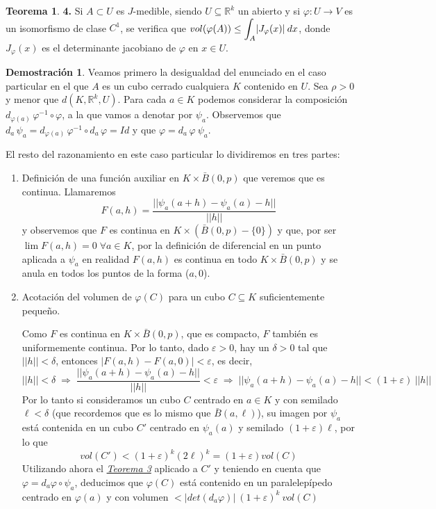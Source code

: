 \documentclass[12pt,twoside]{report}
\theoremstyle{azul}
\theoremstyle{azul2}
\theoremstyle{plain}
\theoremstyle{definition}
\newtheorem*{dem}{Demostración}
\newtheorem*{theo}{Teorema}
\theoremstyle{remark}
\begin{document}
\begin{theo}\textbf{4.}
Si $A\subset U$ es $J$-medible, siendo $U\subseteq\mathbb{R}^k$ un abierto y si $\varphi: U\longrightarrow V$ es un isomorfismo de clase $C^1$, se verifica que $vol(\varphi(A)) \leq  \mathlarger{\int_A} |J_{\varphi}(x)| \: dx$, donde $J_{\varphi}(x)$ es el determinante jacobiano de $\varphi$ en $x\in U$.

\begin{dem}
Veamos primero la desigualdad del enunciado en el caso particular en el que $A$ es un cubo cerrado cualquiera $K$ contenido en $U$. Sea $\rho>0$ y menor que $d(K, \mathbb{R}^k, U)$. Para cada $a\in K$ podemos considerar la composición $d_{\varphi(a)}\, \varphi^{-1} \circ \varphi$, a la que vamos a denotar por $\psi_a$. Observemos que $d_a \, \psi_a=d_{\varphi(a)}\, \varphi^{-1} \circ d_a \, \varphi=Id$ y que $\varphi= d_a\, \varphi \: \psi_a$.

El resto del razonamiento en este caso particular lo dividiremos en tres partes:
\begin{enumerate}
    \item Definición de una función auxiliar en $K \times \bar{B}(0,p)$ que veremos que es continua.
    Llamaremos $$F(a,h)=\dfrac{||\psi_a(a+h) - \psi_a(a) - h||}{||h||}$$ y observemos que $F$ es continua en $K \times (\bar{B}(0,p)-\{0\})$ y que, por ser $\lim F (a,h)=0 \; \forall a \in K$, por la definición de diferencial en un punto aplicada a $\psi_a$ en realidad $F(a,h)$ es continua en todo $K \times \bar{B}(0,p)$ y se anula en todos los puntos de la forma ($a,0$). 
    \item Acotación del volumen de $\varphi(C)$ para un cubo $C \subseteq K$ suficientemente pequeño.
    
    Como $F$ es continua en $K \times \bar{B}(0,p)$, que es compacto, $F$ también es uniformemente continua. Por lo tanto, dado $\varepsilon > 0$, hay un $\delta > 0$ tal que $||h|| < \delta$, entonces $|F(a,h)-F(a,0)|<\varepsilon$, es decir, $$||h|| < \delta \; \Rightarrow \; \dfrac{||\psi_a(a+h) - \psi_a(a) - h||}{||h||} < \varepsilon \; \Rightarrow \; ||\psi_a(a+h) - \psi_a(a) - h||<(1+\varepsilon) \: ||h||$$
    Por lo tanto si consideramos un cubo $C$ centrado en $a \in K$ y con semilado $\ell < \delta$ (que recordemos que es lo mismo que $\bar{B}(a,\ell)$), su imagen por $\psi_a$ está contenida en un cubo $C'$ centrado en $\psi_a(a)$ y semilado $(1+\varepsilon) \ell$, por lo que $$vol(C')< (1+\varepsilon)^k(2 \ell)^k=(1+\varepsilon) vol(C)$$
    Utilizando ahora el \hyperref[teo3]{\textit{Teorema 3}} aplicado a $C'$ y teniendo en cuenta que $\varphi=d_a \varphi \circ \psi_a$, deducimos que $\varphi(C)$ está contenido en un paralelepípedo centrado en $\varphi(a)$ y con volumen $<|det(d_a\varphi)| \: (1+\varepsilon)^k \: vol(C)$
    

\end{enumerate}
\end{dem}
\end{theo}
\end{document}
